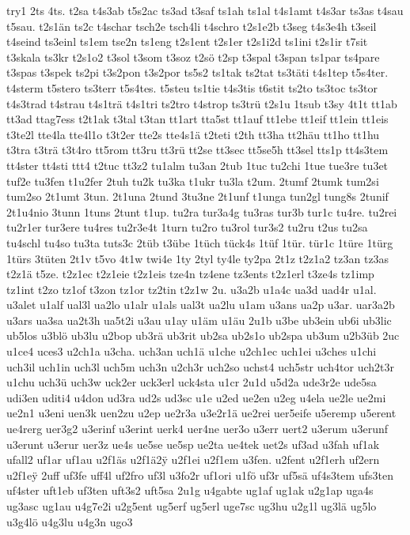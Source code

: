 {try1
2ts
4ts.
t2sa
t4s3ab
t5s2ac
ts3ad
t3saf
ts1ah
ts1al
t4s1amt
t4s3ar
ts3as
t4sau
t5sau.
t2s1än
ts2c
t4schar
tsch2e
tsch4li
t4schro
t2s1e2b
t3seg
t4s3e4h
t3seil
t4seind
ts3einl
ts1em
tse2n
ts1eng
t2s1ent
t2s1er
t2s1i2d
ts1ini
t2s1ir
t7sit
t3skala
ts3kr
t2s1o2
t3sol
t3som
t3soz
t2sö
t2sp
t3spal
t3span
ts1par
ts4pare
t3spas
t3spek
ts2pi
t3s2pon
t3s2por
ts5s2
ts1tak
ts2tat
ts3täti
t4s1tep
t5s4ter.
t4sterm
t5stero
ts3terr
t5s4tes.
t5steu
ts1tie
t4s3tis
t6stit
ts2to
ts3toc
ts3tor
t4s3trad
t4strau
t4s1trä
t4s1tri
ts2tro
t4strop
ts3trü
t2s1u
1tsub
t3sy
4t1t
tt1ab
tt3ad
ttag7ess
t2t1ak
t3tal
t3tan
tt1art
tta5st
tt1auf
tt1ebe
tt1eif
tt1ein
tt1eis
t3te2l
tte4la
tte4l1o
t3t2er
tte2s
tte4s1ä
t2teti
t2th
tt3ha
tt2häu
tt1ho
tt1hu
t3tra
t3trä
t3t4ro
tt5rom
tt3ru
tt3rü
tt2se
tt3sec
tt5se5h
tt3sel
tts1p
tt4s3tem
tt4ster
tt4sti
ttt4
t2tuc
tt3z2
tu1alm
tu3an
2tub
1tuc
tu2chi
1tue
tue3re
tu3et
tuf2e
tu3fen
t1u2fer
2tuh
tu2k
tu3ka
t1ukr
tu3la
t2um.
2tumf
2tumk
tum2si
tum2so
2t1umt
3tun.
2t1una
2tund
3tu3ne
2t1unf
t1unga
tun2gl
tung8s
2tunif
2t1u4nio
3tunn
1tuns
2tunt
t1up.
tu2ra
tur3a4g
tu3ras
tur3b
tur1c
tu4re.
tu2rei
tu2r1er
tur3ere
tu4res
tu2r3e4t
1turn
tu2ro
tu3rol
tur3s2
tu2ru
t2us
tu2sa
tu4schl
tu4so
tu3ta
tuts3c
2tüb
t3übe
1tüch
tück4s
1tüf
1tür.
tür1c
1türe
1türg
1türs
3tüten
2t1v
t5vo
4t1w
twi4e
1ty
2tyl
ty4le
ty2pa
2t1z
t2z1a2
tz3an
tz3as
t2z1ä
t5ze.
t2z1ec
t2z1eie
t2z1eis
tze4n
tz4ene
tz3ents
t2z1erl
t3ze4s
tz1imp
tz1int
t2zo
tz1of
t3zon
tz1or
tz2tin
t2z1w
2u.
u3a2b
u1a4c
ua3d
uad4r
u1al.
u3alet
u1alf
ual3l
ua2lo
u1alr
u1als
ual3t
ua2lu
u1am
u3ans
ua2p
u3ar.
uar3a2b
u3ars
ua3sa
ua2t3h
ua5t2i
u3au
u1ay
u1äm
u1äu
2u1b
u3be
ub3ein
ub6i
ub3lic
ub5los
u3blö
ub3lu
u2bop
ub3rä
ub3rit
ub2sa
ub2s1o
ub2spa
ub3um
u2b3üb
2uc
u1ce4
uces3
u2ch1a
u3cha.
uch3an
uch1ä
u1che
u2ch1ec
uch1ei
u3ches
u1chi
uch3il
uch1in
uch3l
uch5m
uch3n
u2ch3r
uch2so
uchst4
uch5str
uch4tor
uch2t3r
u1chu
uch3ü
uch3w
uck2er
uck3erl
uck4sta
u1cr
2u1d
u5d2a
ude3r2e
ude5sa
udi3en
uditi4
u4don
ud3ra
ud2s
ud3sc
u1e
u2ed
ue2en
u2eg
u4ela
ue2le
ue2mi
ue2n1
u3eni
uen3k
uen2zu
u2ep
ue2r3a
u3e2r1ä
ue2rei
uer5eife
u5eremp
u5erent
ue4rerg
uer3g2
u3erinf
u3erint
uerk4
uer4ne
uer3o
u3err
uert2
u3erum
u3erunf
u3erunt
u3erur
uer3z
ue4s
ue5se
ue5sp
ue2ta
ue4tek
uet2s
uf3ad
u3fah
uf1ak
ufall2
uf1ar
uf1au
u2f1äs
u2f1ä2^^ff
u2f1ei
u2f1em
u3fen.
u2fent
u2f1erh
uf2ern
u2f1e^^ff
2uff
uf3fe
uff4l
uf2fro
uf3l
u3fo2r
uf1ori
u1fö
uf3r
uf5sä
uf4s3tem
ufs3ten
uf4ster
uft1eb
uf3ten
uft3s2
uft5sa
2u1g
u4gabte
ug1af
ug1ak
u2g1ap
uga4s
ug3asc
ug1au
u4g7e2i
u2g5ent
ug5erf
ug5erl
uge7sc
ug3hu
u2g1l
ug3lä
ug5lo
u3g4lö
u4g3lu
u4g3n
ugo3
}

